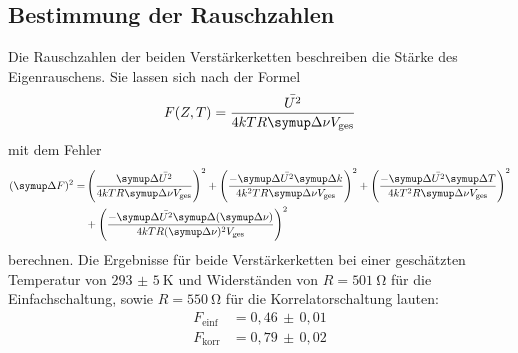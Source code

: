 \subsection{Bestimmung der Rauschzahlen}

Die Rauschzahlen der beiden Verstärkerketten beschreiben die Stärke des Eigenrauschens. Sie lassen sich nach der Formel
%
\begin{equation}
  F(Z,T)=\frac{\bar{U^2}}{4kTR\upD\nu V_\text{ges}}
\end{equation}
%
mit dem Fehler
%
\begin{align*}
  (\upD F)^2=&\left(\frac{\upD \bar{U^2}}{4kTR\upD\nu V_\text{ges}}\right)^2+\left(\frac{-\upD \bar{U^2}\upD k}{4k^2TR\upD\nu V_\text{ges}}\right)^2+\left(\frac{-\upD \bar{U^2}\upD T}{4kT^2R\upD\nu V_\text{ges}}\right)^2 \\
  &+\left(\frac{-\upD \bar{U^2}\upD(\upD\nu)}{4kTR(\upD\nu)^2 V_\text{ges}}\right)^2
\end{align*}
%
berechnen. Die Ergebnisse für beide Verstärkerketten bei einer geschätzten Temperatur von $\SI{293(5)}{\kelvin}$ und Widerständen von $R=\SI{501}{\ohm}$ für die Einfachschaltung, sowie $R=\SI{550}{\ohm}$ für die Korrelatorschaltung lauten:
%
\begin{align*}
  F_\text{einf}&=0,46\,\pm\,0,01 \\
  F_\text{korr}&=0,79\,\pm\,0,02
\end{align*}
